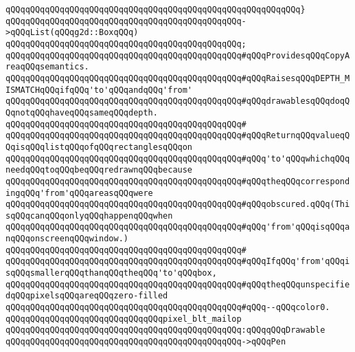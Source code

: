 \verb|qQQqqQQqqQQqqQQqqQQqqQQqqQQqqQQqqQQqqQQqqQQqqQQqqQQqqQQqqQQq}|\newline
\verb|qQQqqQQqqQQqqQQqqQQqqQQqqQQqqQQqqQQqqQQqqQQqqQQq->qQQqList(qQQqg2d::BoxqQQq)|\newline
\verb|qQQqqQQqqQQqqQQqqQQqqQQqqQQqqQQqqQQqqQQqqQQqqQQq;|\newline
\verb|qQQqqQQqqQQqqQQqqQQqqQQqqQQqqQQqqQQqqQQqqQQqqQQq#qQQqProvidesqQQqCopyAreaqQQqsemantics.|\newline
\verb|qQQqqQQqqQQqqQQqqQQqqQQqqQQqqQQqqQQqqQQqqQQqqQQq#qQQqRaisesqQQqDEPTH_MISMATCHqQQqifqQQq'to'qQQqandqQQq'from'|\newline
\verb|qQQqqQQqqQQqqQQqqQQqqQQqqQQqqQQqqQQqqQQqqQQqqQQq#qQQqdrawablesqQQqdoqQQqnotqQQqhaveqQQqsameqQQqdepth.|\newline
\verb|qQQqqQQqqQQqqQQqqQQqqQQqqQQqqQQqqQQqqQQqqQQqqQQq#|\newline
\verb|qQQqqQQqqQQqqQQqqQQqqQQqqQQqqQQqqQQqqQQqqQQqqQQq#qQQqReturnqQQqvalueqQQqisqQQqlistqQQqofqQQqrectanglesqQQqon|\newline
\verb|qQQqqQQqqQQqqQQqqQQqqQQqqQQqqQQqqQQqqQQqqQQqqQQq#qQQq'to'qQQqwhichqQQqneedqQQqtoqQQqbeqQQqredrawnqQQqbecause|\newline
\verb|qQQqqQQqqQQqqQQqqQQqqQQqqQQqqQQqqQQqqQQqqQQqqQQq#qQQqtheqQQqcorrespondingqQQq'from'qQQqareasqQQqwere|\newline
\verb|qQQqqQQqqQQqqQQqqQQqqQQqqQQqqQQqqQQqqQQqqQQqqQQq#qQQqobscured.qQQq(ThisqQQqcanqQQqonlyqQQqhappenqQQqwhen|\newline
\verb|qQQqqQQqqQQqqQQqqQQqqQQqqQQqqQQqqQQqqQQqqQQqqQQq#qQQq'from'qQQqisqQQqanqQQqonscreenqQQqwindow.)|\newline
\verb|qQQqqQQqqQQqqQQqqQQqqQQqqQQqqQQqqQQqqQQqqQQqqQQq#|\newline
\verb|qQQqqQQqqQQqqQQqqQQqqQQqqQQqqQQqqQQqqQQqqQQqqQQq#qQQqIfqQQq'from'qQQqisqQQqsmallerqQQqthanqQQqtheqQQq'to'qQQqbox,|\newline
\verb|qQQqqQQqqQQqqQQqqQQqqQQqqQQqqQQqqQQqqQQqqQQqqQQq#qQQqtheqQQqunspecifiedqQQqpixelsqQQqareqQQqzero-filled|\newline
\verb|qQQqqQQqqQQqqQQqqQQqqQQqqQQqqQQqqQQqqQQqqQQqqQQq#qQQq--qQQqcolor0.|\newline
\newline
\verb|qQQqqQQqqQQqqQQqqQQqqQQqqQQqqQQqpixel_blt_mailop|\newline
\verb|qQQqqQQqqQQqqQQqqQQqqQQqqQQqqQQqqQQqqQQqqQQqqQQq:qQQqqQQqDrawable|\newline
\verb|qQQqqQQqqQQqqQQqqQQqqQQqqQQqqQQqqQQqqQQqqQQqqQQq->qQQqPen|\newline
